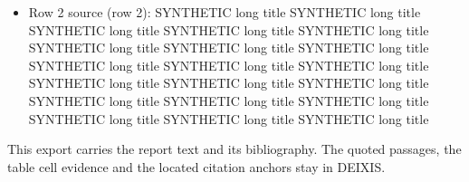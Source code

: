 \documentclass[journal]{IEEEtran}
\begin{document}
\begin{itemize}
\item[5.] Row 2 source (row 2): SYNTHETIC long title SYNTHETIC long title SYNTHETIC long title SYNTHETIC long title SYNTHETIC long title SYNTHETIC long title SYNTHETIC long title SYNTHETIC long title SYNTHETIC long title SYNTHETIC long title SYNTHETIC long title SYNTHETIC long title SYNTHETIC long title SYNTHETIC long title SYNTHETIC long title SYNTHETIC long title SYNTHETIC long title SYNTHETIC long title SYNTHETIC long title SYNTHETIC long title
\end{itemize}

This export carries the report text and its bibliography. The quoted passages, the table cell evidence and the located citation anchors stay in DEIXIS.




\end{document}
